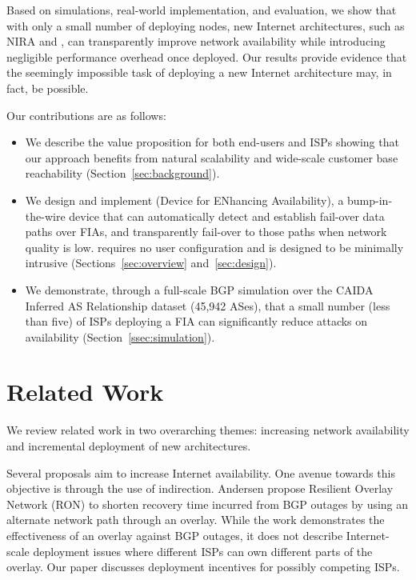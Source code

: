 Based on simulations, real-world implementation, and evaluation, we show that
with only a small number of deploying nodes, new Internet architectures, such
as NIRA and \scion, can transparently improve network availability while
introducing negligible performance overhead once deployed.  Our results provide
evidence that the seemingly impossible task of deploying a new Internet
architecture may, in fact, be possible.

Our contributions are as follows:

\begin{itemize}
\setlength{\itemsep}{-3pt}
	
	\item We describe the value proposition for both end-users and ISPs showing
that our approach benefits from natural scalability and wide-scale customer
base reachability (Section~\ref{sec:background}).

    \item We design and implement \name (Device for ENhancing Availability), a
bump-in-the-wire device that can automatically detect and establish fail-over
data paths over FIAs, and transparently fail-over to those paths when network
quality is low. \name requires no user configuration and is designed to be
minimally intrusive (Sections~\ref{sec:overview} and~\ref{sec:design}).

    \item We demonstrate, through a full-scale BGP simulation over the CAIDA
Inferred AS Relationship dataset (45,942 ASes), that a small number (less than
five) of ISPs deploying a FIA can significantly reduce attacks on availability
(Section~\ref{ssec:simulation}).

\end{itemize}

\section{Related Work}
\label{sec:related}
We review related work in two overarching themes: increasing network
availability and incremental deployment of new architectures. 

Several proposals aim to increase Internet availability. One avenue towards
this objective is through the use of indirection. Andersen \etal\cite{RON2001}
propose Resilient Overlay Network (RON) to shorten recovery time incurred from
BGP outages by using an alternate network path through an overlay. While the
work demonstrates the effectiveness of an overlay against BGP outages, it does
not describe Internet-scale deployment issues where different ISPs can own
different parts of the overlay. Our paper discusses deployment incentives for
possibly competing ISPs. 

